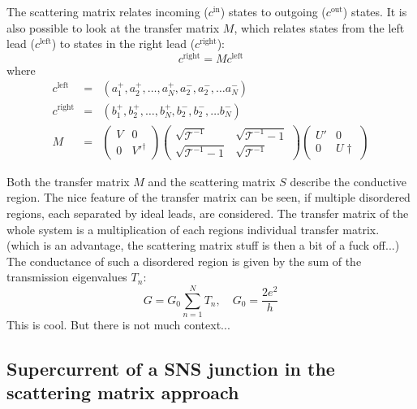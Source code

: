 The scattering matrix relates incoming ($c^\text{in}$) states to outgoing ($c^\text{out}$) states. It is also possible to look at the transfer matrix $M$, which relates states from the left lead ($c^\text{left}$) to states in the right lead ($c^\text{right}$):
\begin{equation}
c^\text{right} = M c^\text{left}
\end{equation}
where 
\begin{eqnarray}
c^\text{left} &=& \left( a_1^+, a_2^+, \dots, a_N^+, a_2^-, a_2^-, \dots a_N^-\right) \\
c^\text{right} &=& \left( b_1^+, b_2^+, \dots, b_N^+, b_2^-, b_2^-, \dots b_N^-\right) \\
M &=& \begin{pmatrix} V & 0 \\ 0 & V'^\dagger \end{pmatrix} \begin{pmatrix} \sqrt{\mathcal{T}^{-1}} & \sqrt{\mathcal{T}^{-1} -1} \\ \sqrt{\mathcal{T}^{-1} -1} & \sqrt{\mathcal{T}^{-1}}\end{pmatrix} \begin{pmatrix} U' & 0 \\ 0 & U\dagger \end{pmatrix}
\end{eqnarray}

Both the transfer matrix $M$ and the scattering matrix $S$ describe the conductive region. The nice feature of the transfer matrix can be seen, if multiple disordered regions, each separated by ideal leads, are considered. The transfer matrix of the whole system is a multiplication of each regions individual transfer matrix. (which is an advantage, the scattering matrix stuff is then a bit of a fuck off...)
The conductance of such a disordered region is given by the sum of the transmission eigenvalues $T_n$:
\begin{equation}
G = G_0 \sum_{n=1}^N T_n, \quad G_0 = \frac{2e^2}{h}
\end{equation}
This is cool. But there is not much context...

\subsection{Supercurrent of a SNS junction in the scattering matrix approach}

